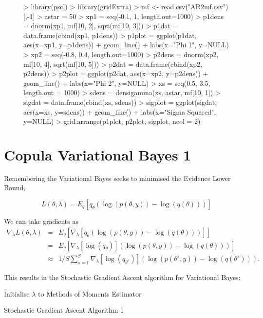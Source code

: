 \documentclass{article}
\begin{document}
\begin{figure}
\begin{Schunk}
\begin{Sinput}
> library(pscl)
> library(gridExtra)
> mf <- read.csv("AR2mf.csv")[,-1]
> astar = 50
> xp1 = seq(-0.1, 1, length.out=1000)
> p1dens = dnorm(xp1, mf[10, 2], sqrt(mf[10, 3]))
> p1dat = data.frame(cbind(xp1, p1dens))
> p1plot = ggplot(p1dat, aes(x=xp1, y=p1dens)) + geom_line() + labs(x="Phi 1", y=NULL)
> xp2 = seq(-0.8, 0.4, length.out=1000)
> p2dens = dnorm(xp2, mf[10, 4], sqrt(mf[10, 5]))
> p2dat = data.frame(cbind(xp2, p2dens))
> p2plot = ggplot(p2dat, aes(x=xp2, y=p2dens)) + geom_line() + labs(x="Phi 2", y=NULL)
> xs = seq(0.5, 3.5, length.out = 1000)
> sdens = densigamma(xs, astar, mf[10, 1])
> sigdat = data.frame(cbind(xs, sdens))
> sigplot = ggplot(sigdat, aes(x=xs, y=sdens)) + geom_line() + labs(x="Sigma Squared", y=NULL)
> grid.arrange(p1plot, p2plot, sigplot, ncol = 2)
\end{Sinput}
\end{Schunk}
\end{figure}

\section{Copula Variational Bayes 1}

Remembering the Variational Bayes seeks to minimised the Evidence Lower Bound, 

$$L(\theta, \lambda) = E_{q} \left[ q_{\theta}(\log(p(\theta, y)) - \log(q(\theta))) \right]$$

We can take gradients as
\begin{eqnarray}
\nabla_{\lambda} L(\theta, \lambda) & = & E_{q} \left[ \nabla_{\lambda}[q_{\theta}(\log(p(\theta, y)) - \log(q(\theta)))] \right] \\
& = & E_{q} \left[ \nabla_{\lambda}[\log(q_{\theta})](\log(p(\theta, y)) - \log(q(\theta))) \right] \nonumber \\
& \approx & 1/S \sum_{s=1}^{S} \nabla_{\lambda}[\log(q_{\theta^s})](\log(p(\theta^s, y)) - \log(q(\theta^s))). \nonumber
\end{eqnarray}

This results in the Stochastic Gradient Ascent algorithm for Variational Bayes:

\begin{algorithm}[H]
 Initialise $\lambda$ to Methods of Moments Estimator\;
 \caption{Stochastic Gradient Ascent Algorithm 1}
\end{algorithm}
\end{document}
